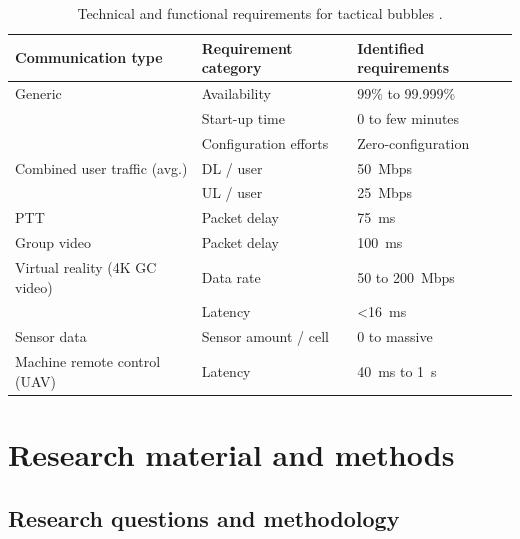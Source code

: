 \documentclass[english, 12pt, a4paper, elec, utf8, a-1b, online]{aaltothesis}
\begin{document}
\begin{table}[h]
  \centering
  \caption{Technical and functional requirements for tactical bubbles \cite{heikkila2021field}.}
  \begin{tabular}{@{}lll@{}}
  \toprule
  Communication type            & Requirement category  & Identified requirements \\ \midrule
  Generic                       & Availability          & 99\% to 99.999\%        \\
                                & Start-up time         & 0 to few minutes        \\
                                & Configuration efforts & Zero-configuration      \\ \addlinespace[0.5em]
  Combined user traffic (avg.)  & DL / user             & 50~Mbps                 \\
                                & UL / user             & 25~Mbps                 \\ \addlinespace[0.5em]
  PTT                           & Packet delay          & 75~ms                   \\ \addlinespace[0.5em]
  Group video                   & Packet delay          & 100~ms                  \\ \addlinespace[0.5em]
  Virtual reality (4K GC video) & Data rate             & 50 to 200~Mbps          \\
                                & Latency               & \textless 16~ms         \\ \addlinespace[0.5em]
  Sensor data                   & Sensor amount / cell  & 0 to massive            \\ \addlinespace[0.5em]
  Machine remote control (UAV)  & Latency               & 40~ms to 1~s            \\ \bottomrule
  \end{tabular}
  \label{table-mcx-requirements}
\end{table}

\clearpage

\section{Research material and methods}

\subsection{Research questions and methodology}
\end{document}
